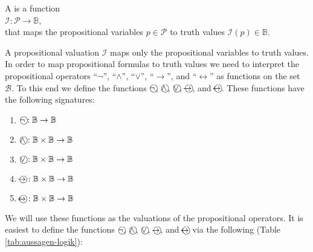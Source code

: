 \begin{Definition}
  A 
   is a function \\[0.2cm]
  \hspace*{1.3cm} $\mathcal{I}:\mathcal{P} \rightarrow \mathbb{B}$, \\[0.2cm]
  that maps the propositional variables  $p\in \mathcal{P}$ to truth values $\mathcal{I}(p) \in \mathbb{B}$.
  \eox
\end{Definition}

A propositional valuation $\mathcal{I}$ maps only the propositional variables to truth values.
In order to map propositional formulas to truth values we need to interpret the propositional operators 
``$\neg$'', ``$\wedge$'', ``$\vee$'', ``$\rightarrow$'', and
``$\leftrightarrow$'' as functions on the set $\mathcal{B}$.  To this end we define the functions
$\circneg$, $\circwedge$, $\circvee$, $\circright$, and $\circleftright$.
These functions have the following signatures:
\begin{enumerate}
\item $\circneg: \mathbb{B} \rightarrow \mathbb{B}$ \index{$\circneg$}
\item $\circwedge: \mathbb{B} \times \mathbb{B} \rightarrow \mathbb{B}$ \index{$\circwedge$}
\item $\circvee: \mathbb{B} \times \mathbb{B} \rightarrow \mathbb{B}$ \index{$\circvee$}
\item $\circright: \mathbb{B} \times \mathbb{B} \rightarrow \mathbb{B}$ \index{$\circright$}
\item $\circleftright: \mathbb{B} \times \mathbb{B} \rightarrow \mathbb{B}$ \index{$\circleftright$}
\end{enumerate}
We will use these functions as the valuations of the propositional operators.
It is easiest to define the functions $\circneg$, $\circwedge$, $\circvee$, $\circright$, and $\circleftright$
via the following   (Table \ref{tab:aussagen-logik}):   


